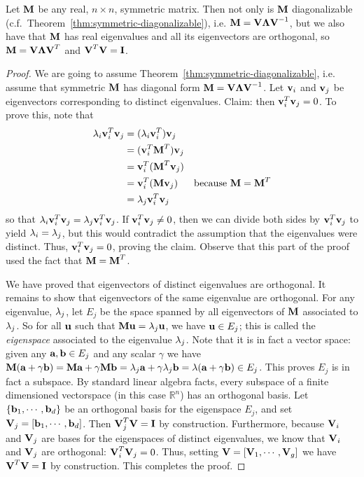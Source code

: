 \begin{proposition}\label{thm:symmetric-orthogonal-eigen}
  Let $\textbf{M}$ be any real, $n\times n$, symmetric matrix. Then not only is $\textbf{M}$ diagonalizable (c.f.~Theorem~\ref{thm:symmetric-diagonalizable}), i.e. $\textbf{M} = \textbf{V}\boldsymbol{\Lambda}\textbf{V}^{-1}$, but we also have that $\textbf{M}$ has real eigenvalues and all its eigenvectors are orthogonal, so $\textbf{M} = \textbf{V} \boldsymbol{\Lambda} \textbf{V}^T$ and $\textbf{V}^T\textbf{V} = \textbf{I}$.
\end{proposition}

\begin{proof}
We are going to assume Theorem~\ref{thm:symmetric-diagonalizable}, i.e. assume that symmetric $\textbf{M}$ has diagonal form $\textbf{M} = \textbf{V} \boldsymbol{\Lambda} \textbf{V}^{-1}$.
Let $\textbf{v}_i$ and $\textbf{v}_j$ be eigenvectors corresponding to distinct eigenvalues. Claim: then $\textbf{v}_i^T\textbf{v}_j = 0$. To prove this, note that
\begin{align}
  \lambda_i \textbf{v}_i^T\textbf{v}_j &= (\lambda_i \textbf{v}_i^T)\textbf{v}_j \\
  &= (\textbf{v}_i^T \textbf{M}^T) \textbf{v}_j \\
  &= \textbf{v}_i^T (\textbf{M}^T \textbf{v}_j) \\
  &= \textbf{v}_i^T (\textbf{M} \textbf{v}_j) & \text{because $\textbf{M} = \textbf{M}^T$} \\
  &= \lambda_j  \textbf{v}_i^T \textbf{v}_j
\end{align}
so that $\lambda_i \textbf{v}_i^T\textbf{v}_j = \lambda_j \textbf{v}_i^T\textbf{v}_j$. If $\textbf{v}_i^T\textbf{v}_j \neq 0 $, then we can divide both sides by $\textbf{v}_i^T\textbf{v}_j$ to yield $\lambda_i = \lambda_j$, but this would contradict the assumption that the eigenvalues were distinct. Thus, $\textbf{v}_i^T\textbf{v}_j = 0$, proving the claim. Observe that this part of the proof used the fact that $\textbf{M} = \textbf{M}^T$.

We have proved that eigenvectors of distinct eigenvalues are orthogonal. It remains to show that eigenvectors of the same eigenvalue are orthogonal. For any eigenvalue, $\lambda_j$, let $E_j$ be the space spanned by all eigenvectors of $\textbf{M}$ associated to $\lambda_j$. So for all $\textbf{u}$ such that $\textbf{M} \textbf{u} = \lambda_j \textbf{u}$, we have $\textbf{u} \in E_j$; this is called the \emph{eigenspace} associated to the eigenvalue $\lambda_j$.
Note that it is in fact a vector space: given any $\textbf{a}, \textbf{b} \in E_j$ and any scalar $\gamma$ we have $\textbf{M}(\textbf{a} + \gamma \textbf{b}) = \textbf{M}\textbf{a} + \gamma \textbf{M}\textbf{b} = \lambda_j\textbf{a} + \gamma\lambda_j\textbf{b} = \lambda(\textbf{a} + \gamma\textbf{b}) \in E_j$. This proves $E_j$ is in fact a subspace.
By standard linear algebra facts, every subspace of a finite dimensioned vectorspace (in this case $\mathbb{R}^n$) has an orthogonal basis.
Let $\{\textbf{b}_1, \cdots, \textbf{b}_d\}$ be an orthogonal basis for the eigenspace $E_j$, and set $\textbf{V}_j = [ \textbf{b}_1, \cdots, \textbf{b}_d]$.
Then $\textbf{V}_j^T\textbf{V} = \textbf{I}$ by construction. Furthermore, because $\textbf{V}_i$ and $\textbf{V}_j$ are bases for the eigenspaces of distinct eigenvalues, we know that $\textbf{V}_i$ and $\textbf{V}_j$ are orthogonal: $\textbf{V}_i^T\textbf{V}_j = 0$. Thus, setting $\textbf{V} = [ \textbf{V}_1, \cdots , \textbf{V}_g]$ we have $\textbf{V}^T\textbf{V} = \textbf{I}$ by construction. This completes the proof.
\end{proof}


